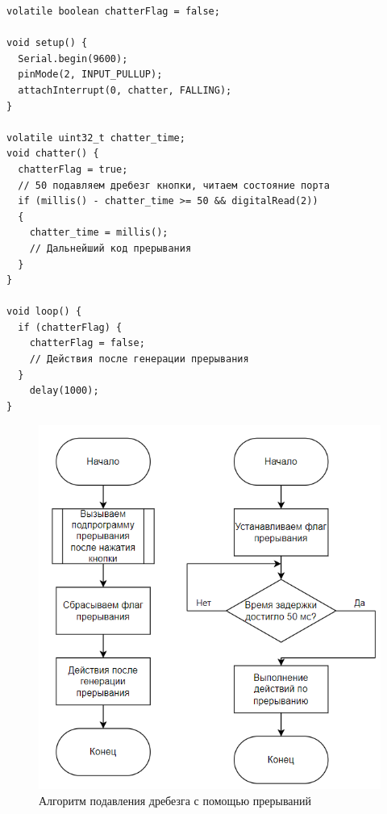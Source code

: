 \documentclass{altsu-report}
\begin{document}
\begin{code}
\label{code:pi-example}
\begin{verbatim}
volatile boolean chatterFlag = false; 
 
void setup() {
  Serial.begin(9600);
  pinMode(2, INPUT_PULLUP); 
  attachInterrupt(0, chatter, FALLING);
}
 
volatile uint32_t chatter_time;
void chatter() {
  chatterFlag = true;
  // 50 подавляем дребезг кнопки, читаем состояние порта
  if (millis() - chatter_time >= 50 && digitalRead(2))
  {
    chatter_time = millis();
    // Дальнейший код прерывания
  }
}
 
void loop() {
  if (chatterFlag) {
    chatterFlag = false;    
    // Действия после генерации прерывания
  } 
    delay(1000);              
}
\end{verbatim}
\end{code}

\begin{figure}[H]
    \centering
    \includegraphics[scale=0.6]{algorithm.png}
    \caption{Алгоритм подавления дребезга с помощью прерываний}
    \label{fig:alg}
\end{figure}
\end{document}
